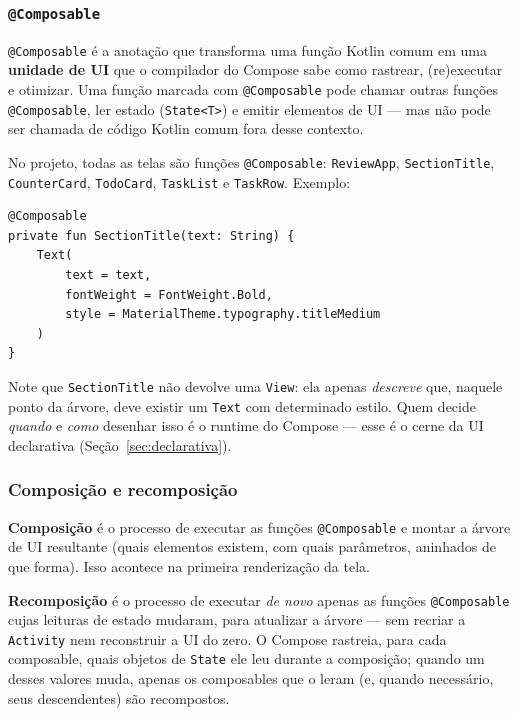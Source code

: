 \documentclass[11pt,a4paper]{article}
\begin{document}
\subsubsection{\texttt{@Composable}}

\texttt{@Composable} é a anotação que transforma uma função Kotlin comum
em uma \textbf{unidade de UI} que o compilador do Compose sabe como
rastrear, (re)executar e otimizar. Uma função marcada com
\texttt{@Composable} pode chamar outras funções \texttt{@Composable}, ler
estado (\texttt{State<T>}) e emitir elementos de UI — mas não pode ser
chamada de código Kotlin comum fora desse contexto.

No projeto, todas as telas são funções \texttt{@Composable}:
\texttt{ReviewApp}, \texttt{SectionTitle}, \texttt{CounterCard},
\texttt{TodoCard}, \texttt{TaskList} e \texttt{TaskRow}. Exemplo:

\begin{lstlisting}[caption={Uma função @Composable simples e reutilizável}, label=lst:composable]
@Composable
private fun SectionTitle(text: String) {
    Text(
        text = text,
        fontWeight = FontWeight.Bold,
        style = MaterialTheme.typography.titleMedium
    )
}
\end{lstlisting}

Note que \texttt{SectionTitle} não devolve uma \texttt{View}: ela apenas
\emph{descreve} que, naquele ponto da árvore, deve existir um
\texttt{Text} com determinado estilo. Quem decide \emph{quando} e
\emph{como} desenhar isso é o runtime do Compose — esse é o cerne da UI
declarativa (Seção~\ref{sec:declarativa}).

\subsubsection{Composição e recomposição}

\textbf{Composição} é o processo de executar as funções
\texttt{@Composable} e montar a árvore de UI resultante (quais elementos
existem, com quais parâmetros, aninhados de que forma). Isso acontece na
primeira renderização da tela.

\textbf{Recomposição} é o processo de executar \emph{de novo} apenas as
funções \texttt{@Composable} cujas leituras de estado mudaram, para
atualizar a árvore — sem recriar a \texttt{Activity} nem reconstruir a
UI do zero. O Compose rastreia, para cada composable, quais objetos de
\texttt{State} ele leu durante a composição; quando um desses valores
muda, apenas os composables que o leram (e, quando necessário, seus
descendentes) são recompostos.
\end{document}
